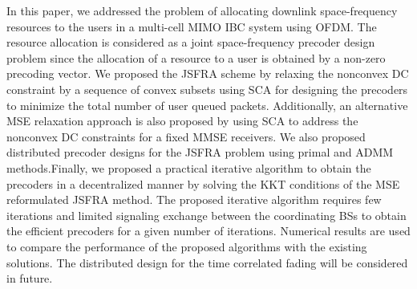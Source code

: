 In this paper, we addressed the problem of allocating downlink space-frequency resources to the users in a multi-cell \ac{MIMO} \ac{IBC} system using \ac{OFDM}. The resource allocation is considered as a joint space-frequency precoder design problem since the allocation of a resource to a user is obtained by a non-zero precoding vector. We proposed the \ac{JSFRA} scheme by relaxing the nonconvex \ac{DC} constraint by a sequence of convex subsets using \ac{SCA} for designing the precoders to minimize the total number of user queued packets. Additionally, an alternative \ac{MSE} relaxation approach is also proposed by using \ac{SCA} to address the nonconvex \ac{DC} constraints for a fixed \ac{MMSE} receivers. We also proposed distributed precoder designs for the \ac{JSFRA} problem using primal and \ac{ADMM} methods.Finally, we proposed a practical iterative algorithm to obtain the precoders in a decentralized manner by solving the \ac{KKT} conditions of the \ac{MSE} reformulated \ac{JSFRA} method.  The proposed iterative algorithm requires few iterations and limited signaling exchange between the coordinating \acp{BS} to obtain the efficient precoders for a given number of iterations. Numerical results are used to compare the performance of the proposed algorithms with the existing solutions. The distributed design for the time correlated fading will be considered in future.